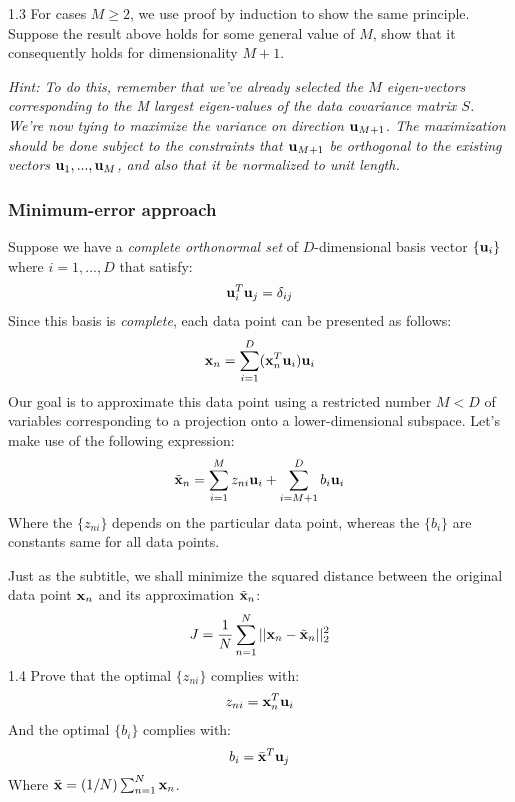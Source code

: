 \documentclass{article}
\theoremstyle{definition}
\theoremstyle{definition}
\theoremstyle{remark}
\begin{document}
1.3 For cases $M\geq 2$, we use proof by induction to show the same principle. Suppose the result above holds for some general value of $M$, show that it consequently holds for dimensionality $M+1$.

\emph{Hint: To do this, remember that we've already selected the $M$ eigen-vectors corresponding to the M largest eigen-values of the data covariance matrix $S$. We're now tying to maximize the variance on direction $\bold{u}_{M+1}$. The maximization should be done subject to the constraints that $\bold{u}_{M+1}$ be orthogonal to the existing vectors $\bold{u}_{1}, ..., \bold{u}_{M}$, and also that it be normalized to unit length.}
\subsubsection*{Minimum-error approach}
Suppose we have a \emph{complete orthonormal set} of $D$-dimensional basis vector $\{\bold{u}_{i}\}$ where $i=1, ..., D$ that satisfy:
\begin{eqnarray}
\bold{u}_{i}^{T}\bold{u}_{j}=\delta_{ij}
\end{eqnarray}
Since this basis is \emph{complete}, each data point can be presented as follows:
\begin{eqnarray}
\bold{x}_{n}=\sum_{i=1}^{D}(\bold{x}_{n}^{T}\bold{u}_{i})\bold{u}_{i}
\end{eqnarray}
Our goal is to approximate this data point using a restricted number $M<D$ of variables corresponding to a projection onto a lower-dimensional subspace. Let's make use of the following expression:
\begin{eqnarray}
\tilde{\bold{x}}_{n}=\sum_{i=1}^{M}z_{ni}\bold{u}_{i}+\sum_{i=M+1}^{D}b_{i}\bold{u}_{i}
\end{eqnarray}
Where the $\{z_{ni}\}$ depends on the particular data point, whereas the $\{b_{i}\}$ are constants same for all data points.

Just as the subtitle, we shall minimize the squared distance between the original data point $\bold{x}_{n}$ and its approximation $\tilde{\bold{x}}_{n}$:
\begin{eqnarray}
J=\frac{1}{N}\sum_{n=1}^{N}||\bold{x}_{n}-\tilde{\bold{x}}_{n}||_{2}^{2}
\end{eqnarray}
1.4 Prove that the optimal $\{z_{ni}\}$ complies with:
\begin{eqnarray}
z_{ni}=\bold{x}_{n}^{T}\bold{u}_{i}
\end{eqnarray}
And the optimal $\{b_{i}\}$ complies with:
\begin{eqnarray}
b_{i}=\bar{\bold{x}}^{T}\bold{u}_{j}
\end{eqnarray}
Where $\bar{\bold{x}}=(1/N)\sum_{n=1}^{N}\bold{x}_{n}$.
\end{document}
